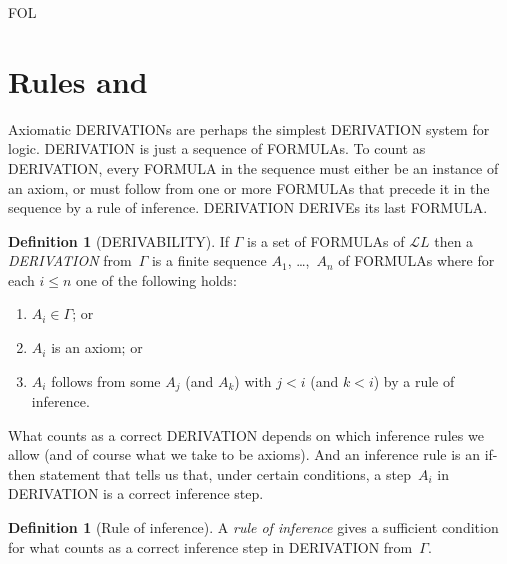 \documentclass[10pt,a4paper]{article}
\newcommand*{\olup}[1]{\MakeUppercase{#1}}
\theoremstyle{plain}
\theoremstyle{definition}
\newtheorem{defn}[thm]{Definition}
\theoremstyle{remark}
\newenvironment{explain}{}{}
\newcommand*{\olfileid}[3]{}
\newcommand*{\olsection}[1]{\section*{#1}}
\providecommand{\Lang}{\ensuremath{\mathcal{L}}}
\providecommand{\iftag}[1]{#1}
\providecommand{\iftag}{}
\begin{document}



\iftag{FOL}
      {\olfileid{fol}{axd}{rul}}
      {\olfileid{pl}{axd}{rul}}

\olsection{Rules and }

\begin{explain}
  Axiomatic \olup{derivation}s are perhaps the simplest \olup{derivation} system for
  logic. \olup{derivation} is just a sequence of \olup{formula}s.  To
  count as \olup{derivation}, every \olup{formula} in the sequence must
  either be an instance of an axiom, or must follow from one or more
  \olup{formula}s that precede it in the sequence by a rule of inference.
  \olup{derivation} \olup{derive}s its last \olup{formula}.
\end{explain}

\begin{defn}[\olup{derivability}]
If $\Gamma$ is a set of \olup{formula}s of $\Lang L$ then a
\emph{\olup{derivation}} from~$\Gamma$ is a finite sequence $A_1$,
\dots,~$A_n$ of \olup{formula}s where for each $i \le n$ one of the
following holds:
\begin{enumerate}
\item $A_i \in \Gamma$; or
\item $A_i$ is an axiom; or
\item $A_i$ follows from some $A_j$ (and $A_k$) with $j < i$ (and
  $k < i$) by a rule of inference.
\end{enumerate}
\end{defn}

What counts as a correct \olup{derivation} depends on which inference
rules we allow (and of course what we take to be axioms).  And an
inference rule is an if-then statement that tells us that, under
certain conditions, a step~$A_i$ in \olup{derivation} is a correct
inference step.

\begin{defn}[Rule of inference]
A \emph{rule of inference} gives a sufficient condition for what
counts as a correct inference step in \olup{derivation} from~$\Gamma$.
\end{defn}
\end{document}
